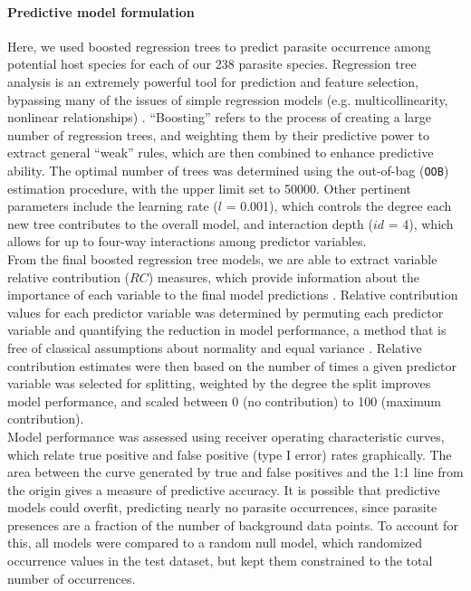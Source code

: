 \documentclass[12pt]{article}
\begin{document}
 \paragraph{Predictive model formulation}
  Here, we used boosted regression trees to predict parasite occurrence among potential host species for each of our 238 parasite species. Regression tree analysis is an extremely powerful tool for prediction and feature selection, bypassing many of the issues of simple regression models (e.g. multicollinearity, nonlinear relationships) \cite{elith2008, dallas2014}. “Boosting” refers to the process of creating a large number of regression trees, and weighting them by their predictive power to extract general “weak” rules, which are then combined to enhance predictive ability. The optimal number of trees was determined using the out-of-bag (\texttt{OOB}) estimation procedure, with the upper limit set to 50000. Other pertinent parameters include the learning rate ($l$ = 0.001), which controls the degree each new tree contributes to the overall model, and interaction depth ($id$ = 4), which allows for up to four-way interactions among predictor variables. \\
  
  From the final boosted regression tree models, we are able to extract variable relative contribution ($RC$) measures, which provide information about the importance of each variable to the final model predictions \citep{breiman2001}. Relative contribution values for each predictor variable was determined by permuting each predictor variable and quantifying the reduction in model performance, a method that is free of classical assumptions about normality and equal variance \citep{anderson2001}. Relative contribution estimates were then based on the number of times a given predictor variable was selected for splitting, weighted by the degree the split improves model performance, and scaled between 0 (no contribution) to 100 (maximum contribution). \\
  
  Model performance was assessed using receiver operating characteristic curves, which relate true positive and false positive (type I error) rates graphically. The area between the curve generated by true and false positives and the 1:1 line from the origin gives a measure of predictive accuracy. It is possible that predictive models could overfit, predicting nearly no parasite occurrences, since parasite presences are a fraction of the number of background data points. To account for this, all models were compared to a random null model, which randomized occurrence values in the test dataset, but kept them constrained to the total number of occurrences.  
  
\end{document}
